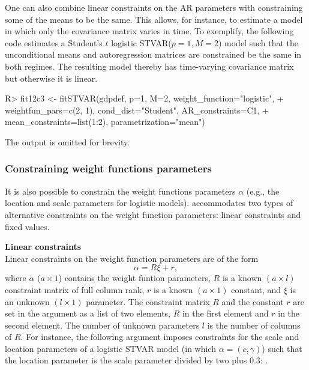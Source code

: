 \documentclass[nojss]{jss}
\begin{document}
One can also combine linear constraints on the AR parameters with constraining some of the means to be the same. This allows, for instance, to estimate a model in which only the covariance matrix varies in time. To exemplify, the following code estimates a Student's $t$ logistic STVAR($p=1, M=2$) model such that the unconditional means and autoregression matrices are constrained be the same in both regimes. The resulting model thereby has time-varying covariance matrix but otherwise it is linear.
%
\begin{CodeChunk}
\begin{CodeInput}
R> fit12c3 <- fitSTVAR(gdpdef, p=1, M=2, weight_function="logistic",
+    weightfun_pars=c(2, 1), cond_dist="Student", AR_constraints=C1,
+    mean_constraints=list(1:2), parametrization="mean")
\end{CodeInput}
\end{CodeChunk}
%
The output is omitted for brevity.

\subsubsection{Constraining weight functions parameters}
It is also possible to constrain the weight functions parameters $\alpha$ (e.g., the location and scale parameters for logistic models).  accommodates two types of alternative constraints on the weight function parameters: linear constraints and fixed values.

\textbf{Linear constraints}\\
Linear constraints on the weight function parameters are of the form
\begin{equation}
\alpha = R\xi + r,
\end{equation}
where $\alpha$ ($a \times 1$) contains the weight funtion parameters, $R$ is a known $(a \times l)$ constraint matrix of full column rank, $r$ is a known $(a \times 1)$ constant, and $\xi$ is an unknown $(l \times 1)$ parameter. The constraint matrix $R$ and the constant $r$ are set in the argument  as a list of two elements, $R$ in the first element and $r$ in the second element. The number of unknown parameters $l$ is the number of columns of $R$. For instance, the following argument imposes constraints for the scale and location parameters of a logistic STVAR model (in which $\alpha = (c,\gamma)$) such that the location parameter is the scale parameter divided by two plus $0.3$: .
\end{document}
